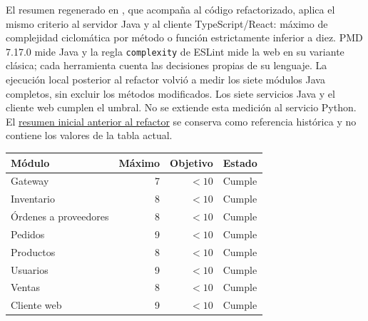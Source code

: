 \documentclass[12pt,a4paper]{article}
\begin{document}
El resumen regenerado en , que acompaña al código refactorizado, aplica el mismo criterio al servidor Java y al cliente TypeScript/React: máximo de complejidad ciclomática por método o función estrictamente inferior a diez. PMD 7.17.0 mide Java y la regla \texttt{complexity} de ESLint mide la web en su variante clásica; cada herramienta cuenta las decisiones propias de su lenguaje. La ejecución local posterior al refactor volvió a medir los siete módulos Java completos, sin excluir los métodos modificados. Los siete servicios Java y el cliente web cumplen el umbral. No se extiende esta medición al servicio Python. El \href{https://github.com/JoseLozanoMorales/TiendaTech/blob/f6de7608d79b746d11a4c14440c89086d765b279/docs/experimentos/resultados/iso25010/complejidad/summary.csv}{resumen inicial anterior al refactor} se conserva como referencia histórica y no contiene los valores de la tabla actual.

\begin{center}
\begin{tabular}{lrrl}
\hline
Módulo & Máximo & Objetivo & Estado\\
\hline
Gateway & 7 & $<10$ & Cumple\\
Inventario & 8 & $<10$ & Cumple\\
Órdenes a proveedores & 8 & $<10$ & Cumple\\
Pedidos & 9 & $<10$ & Cumple\\
Productos & 8 & $<10$ & Cumple\\
Usuarios & 9 & $<10$ & Cumple\\
Ventas & 8 & $<10$ & Cumple\\
Cliente web & 9 & $<10$ & Cumple\\
\hline
\end{tabular}
\end{center}
\end{document}
